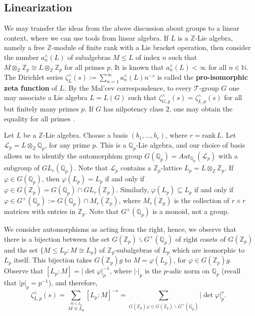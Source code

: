 \documentclass[12pt]{article}
\begin{document}
\subsection{Linearization}
We may transfer the ideas from the above discussion about groups to a linear context, where we can use tools from linear algebra.
If $L$ is a $\mathbb{Z}$-Lie algebra, namely a free $\mathbb{Z}$-module of finite rank with a Lie bracket operation, then consider the number $a_{n}^{\wedge}(L)$ of subalgebras $M\leq L$ of index $n$ such that $M\otimes_{\mathbb{Z}}\mathbb{Z}_p\cong L\otimes_{\mathbb{Z}}\mathbb{Z}_p$ for all primes $p$. It is known that $a_{n}^{\wedge}(L)<\infty$ for all $n\in\mathbb{N}$. The Dirichlet series $\zeta_{L}^{\wedge}(s):=\sum_{n=1}^{\infty}{a_{n}^{\wedge}}(L)n^{-s}$ is called the \textbf{pro-isomorphic zeta function} of $L$. By the Mal'cev correspondence, to every $\mathcal{T}$-group $G$ one may associate a Lie algebra $L=L(G)$ such that $\zeta_{G,p}^{\wedge}(s)=\zeta_{L,p}^{\wedge}(s)$ for all but finitely many primes $p$. If $G$ has nilpotency class $2$, one may obtain the equality for all primes \cite[Theorem 4.1]{GrunewaldSegalSmith}.\par
Let $L$ be a $\mathbb{Z}$-Lie algebra. Choose a basis $(b_1,\dots,b_r)$, where $r=\mathrm{rank}\,L$. Let $\mathcal{L}_{p}=L\otimes_{\mathbb{Z}}\mathbb{Q}_p$, for any prime $p$. This is a $\mathbb{Q}_p$-Lie algebra, and our choice of basis allows us to identify the automorphism group $G(\mathbb{Q}_p)=Aut_{\mathbb{Q}_p}(\mathcal{L}_{p})$ with a subgroup of $GL_r(\mathbb{Q}_p)$. Note that $\mathcal{L}_{p}$ contains a $\mathbb{Z}_p$-lattice $L_{p}=L\otimes_{\mathbb{Z}}\mathbb{Z}_p$. If $\varphi\in G(\mathbb{Q}_p)$, then $\varphi(L_{p})=L_{p}$ if and only if $\varphi\in G(\mathbb{Z}_p)=G(\mathbb{Q}_p)\cap GL_r(\mathbb{Z}_p)$. Similarly, $\varphi(L_{p})\subseteq L_{p}$ if and only if $\varphi\in G^{+}(\mathbb{Q}_p):=G(\mathbb{Q}_p)\cap {M}_r(\mathbb{Z}_p)$, where ${M}_r(\mathbb{Z}_p)$ is the collection of $r\times r$ matrices with entries in $\mathbb{Z}_p$. Note that $G^{+}(\mathbb{Q}_p)$ is a monoid, not a group.\par
We consider automorphisms as acting from the right, hence, we observe that there is a bijection between the set $G(\mathbb{Z}_p)\backslash G^{+}(\mathbb{Q}_p)$ of right cosets of $G(\mathbb{Z}_p)$ and the set $\{M\leq L_{p} : M\cong L_{p}\}$ of $\mathbb{Z}_{p}$-subalgebras of $L_{p}$ which are isomorphic to $L_{p}$ itself. This bijection takes $G(\mathbb{Z}_p)g$ to $M=\varphi(L_{p})$, for $\varphi\in G(\mathbb{Z}_p)g$.
Observe that $[L_{p}:M]=|\det\varphi|_p^{-1}$, where $|\cdot|_p$ is the $p$-adic norm on $\mathbb{Q}_{p}$ (recall that $|p|_{p}=p^{-1}$), and therefore,
\begin{equation}
\label{eq:proisomorphic.zeta}
\zeta_{L,p}^{\wedge}(s)=\underset{\overset{\scriptscriptstyle M\leq L_{p}}{\scriptscriptstyle M\cong L_{p}}}{\sum}[L_{p}:M]^{-s}=\underset{\scriptscriptstyle G(\mathbb{Z}_p)\varphi\in G(\mathbb{Z}_p)\backslash G^{+}(\mathbb{Q}_p)}{\sum}|\det\varphi|_p^s.
\end{equation}
\end{document}
